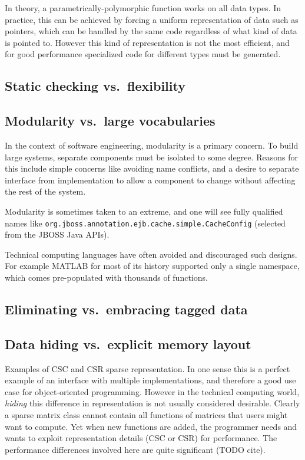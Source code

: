 In theory, a parametrically-polymorphic function works on all data
types.
In practice, this can be achieved by forcing a uniform representation of
data such as pointers, which can be handled by the same code regardless of
what kind of data is pointed to.
However this kind of representation is not the most efficient, and
for good performance specialized code for different types must be
generated.

\subsection{Static checking vs.\ flexibility}

\subsection{Modularity vs.\ large vocabularies}

In the context of software engineering, modularity is a primary concern.
To build large systems, separate components must be isolated to some
degree.
Reasons for this include simple concerns like avoiding name conflicts,
and a desire to separate interface from implementation to allow
a component to change without affecting the rest of the system.

Modularity is sometimes taken to an extreme, and one will see
fully qualified names like \texttt{org.jboss.annotation.ejb.cache.simple.CacheConfig}
(selected from the JBOSS Java APIs).

Technical computing languages have often avoided and discouraged such
designs. For example MATLAB for most of its history supported only a single
namespace, which comes pre-populated with thousands of functions.


\subsection{Eliminating vs.\ embracing tagged data}

\subsection{Data hiding vs.\ explicit memory layout}

Examples of CSC and CSR sparse representation.
In one sense this is a perfect example of an interface with multiple implementations,
and therefore a good use case for object-oriented programming.
However in the technical computing world, \emph{hiding} this difference in
representation is not usually considered desirable.
Clearly a sparse matrix class cannot contain all functions of matrices that users
might want to compute.
Yet when new functions are added, the programmer needs and wants to exploit
representation details (CSC or CSR) for performance.
The performance differences involved here are quite significant (TODO cite).

